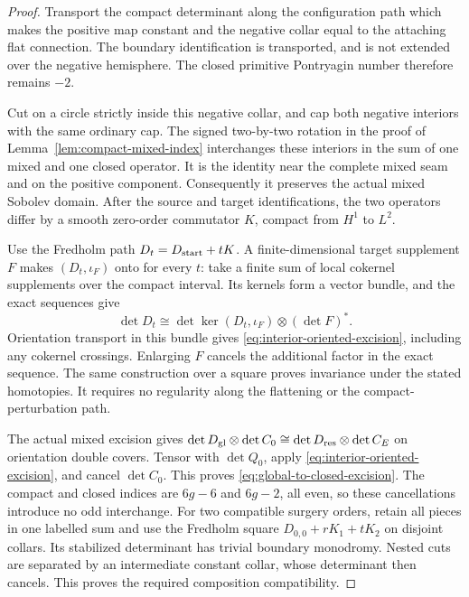 \documentclass[11pt]{amsart}
\theoremstyle{definition}
\theoremstyle{remark}
\theoremstyle{plain}
\begin{document}
\begin{proof}
Transport the compact determinant along the
configuration path which makes the positive map
constant and the negative collar equal to the
attaching flat connection. The boundary identification
is transported, and is not extended over the negative
hemisphere. The closed primitive Pontryagin number
therefore remains $-2$.

Cut on a circle strictly inside this negative collar,
and cap both negative interiors with the same ordinary
cap. The signed two-by-two rotation in the proof of
Lemma~\ref{lem:compact-mixed-index} interchanges these
interiors in the sum of one mixed and one closed
operator. It is the identity near the complete mixed
seam and on the positive component. Consequently it
preserves the actual mixed Sobolev domain. After the
source and target identifications, the two operators
differ by a smooth zero-order commutator $K$, compact
from $H^1$ to $L^2$.

Use the Fredholm path $D_t=D_{\rm start}+tK$.
A finite-dimensional target supplement $F$ makes
$(D_t,\iota_F)$ onto for every $t$: take a finite
sum of local cokernel supplements over the compact
interval. Its kernels form a vector bundle, and
the exact sequences give
\[
 \det D_t\cong
 \det\ker(D_t,\iota_F)\otimes(\det F)^*.
\]
Orientation transport in this bundle gives
\eqref{eq:interior-oriented-excision}, including
any cokernel crossings. Enlarging $F$ cancels the
additional factor in the exact sequence. The same
construction over a square proves invariance under
the stated homotopies. It requires no regularity
along the flattening or the compact-perturbation path.

The actual mixed excision gives
$\det D_{\rm gl}\otimes\det C_0
\cong\det D_{\rm res}\otimes\det C_E$
on orientation double covers. Tensor with $\det Q_0$,
apply \eqref{eq:interior-oriented-excision}, and
cancel $\det C_0$. This proves
\eqref{eq:global-to-closed-excision}. The compact
and closed indices are $6g-6$ and $6g-2$, all even,
so these cancellations introduce no odd interchange.
For two compatible surgery orders, retain all
pieces in one labelled sum and use the Fredholm
square $D_{0,0}+rK_1+tK_2$ on disjoint collars.
Its stabilized determinant has trivial boundary
monodromy. Nested cuts are separated by an
intermediate constant collar, whose determinant
then cancels. This proves the required composition
compatibility.
\end{proof}
\end{document}
